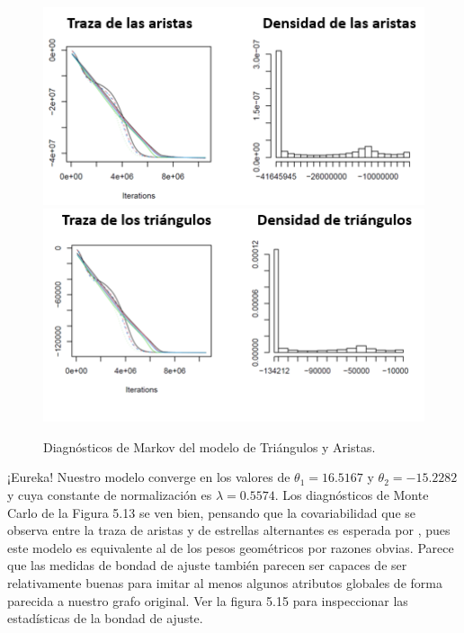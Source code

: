 \begin{figure}[!ht]
\includegraphics[width=1\textwidth]{Tesis/Figures/mcmc_1.PNG}
\includegraphics[width=1\textwidth]{Tesis/Figures/mcmc_2.PNG}

\caption{Diagnósticos de Markov del modelo de Triángulos y Aristas.}
\centering
\end{figure}

¡Eureka! Nuestro modelo converge en los valores de $\theta_1 = 16.5167$ y $\theta_2 = -15.2282$ y cuya constante de normalización es $\lambda = 0.5574$. Los diagnósticos de Monte Carlo de la Figura 5.13 se ven bien, pensando que la covariabilidad que se observa entre la traza de aristas y de estrellas alternantes es esperada por \cite{GoodOfFitSocialNetwork}, pues este modelo es equivalente al de los pesos geométricos por razones obvias. Parece que las medidas de bondad de ajuste también parecen ser capaces de ser relativamente buenas para imitar al menos algunos atributos globales de forma parecida a nuestro grafo original. Ver la figura 5.15 para inspeccionar las estadísticas de la bondad de ajuste.

